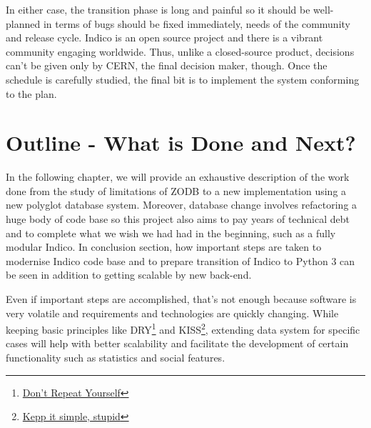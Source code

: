 \par In either case, the transition phase is long and painful so it should be well-planned in terms of bugs should be fixed immediately, needs of the community and release cycle. Indico is an open source project and there is a vibrant community engaging worldwide. Thus, unlike a closed-source product, decisions can't be given only by \textsc{CERN}, the final decision maker, though. Once the schedule is carefully studied, the final bit is to implement the system conforming to the plan.

\section{Outline - What is Done and Next?}

\par In the following chapter, we will provide an exhaustive description of the work done from the study of limitations of ZODB to a new implementation using a new polyglot database system. Moreover, database change involves refactoring a huge body of code base so this project also aims to pay years of technical debt and to complete what we wish we had had in the beginning, such as a fully modular Indico. In conclusion section, how important steps are taken to modernise Indico code base and to prepare transition of Indico to Python 3 can be seen in addition to getting scalable by new back-end.

\par Even if important steps are accomplished, that's not enough because software is very volatile and requirements and technologies are quickly changing. While keeping basic principles like DRY\footnote{\href{http://en.wikipedia.org/wiki/Don't_repeat_yourself}{Don't Repeat Yourself}} and KISS\footnote{\href{http://en.wikipedia.org/wiki/KISS_principle}{Kepp it simple, stupid}}, extending data system for specific cases will help with better scalability and facilitate the development of certain functionality such as statistics and social features.


